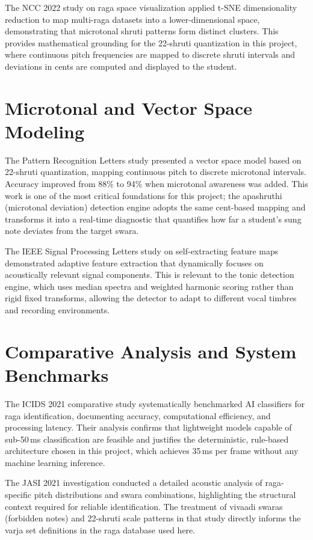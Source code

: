 \documentclass[12pt,a4paper]{report}
\numberwithin{equation}{chapter}
\begin{document}
The NCC 2022 study on raga space visualization \cite{ncc2022raga} applied t-SNE dimensionality reduction to map multi-raga datasets into a lower-dimensional space, demonstrating that microtonal shruti patterns form distinct clusters. This provides mathematical grounding for the 22-shruti quantization in this project, where continuous pitch frequencies are mapped to discrete shruti intervals and deviations in cents are computed and displayed to the student.

\section{Microtonal and Vector Space Modeling}
The Pattern Recognition Letters study \cite{prl2021vector} presented a vector space model based on 22-shruti quantization, mapping continuous pitch to discrete microtonal intervals. Accuracy improved from 88\% to 94\% when microtonal awareness was added. This work is one of the most critical foundations for this project; the apashruthi (microtonal deviation) detection engine adopts the same cent-based mapping and transforms it into a real-time diagnostic that quantifies how far a student's sung note deviates from the target swara.

The IEEE Signal Processing Letters study on self-extracting feature maps \cite{ieee2021self} demonstrated adaptive feature extraction that dynamically focuses on acoustically relevant signal components. This is relevant to the tonic detection engine, which uses median spectra and weighted harmonic scoring rather than rigid fixed transforms, allowing the detector to adapt to different vocal timbres and recording environments.

\section{Comparative Analysis and System Benchmarks}
The ICIDS 2021 comparative study \cite{ic2021comparative} systematically benchmarked AI classifiers for raga identification, documenting accuracy, computational efficiency, and processing latency. Their analysis confirms that lightweight models capable of sub-50\,ms classification are feasible and justifies the deterministic, rule-based architecture chosen in this project, which achieves 35\,ms per frame without any machine learning inference.

The JASI 2021 investigation \cite{jasi2021investigation} conducted a detailed acoustic analysis of raga-specific pitch distributions and swara combinations, highlighting the structural context required for reliable identification. The treatment of vivaadi swaras (forbidden notes) and 22-shruti scale patterns in that study directly informs the varja set definitions in the raga database used here.
\end{document}
